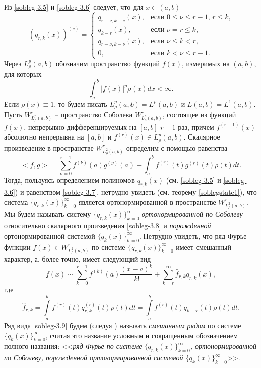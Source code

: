  Из \eqref{sobleg-3.5} и \eqref{sobleg-3.6} следует, что для $x\in (a,b)$
 \begin{equation}\label{sobleg-3.7}
(q_{r,k}(x))^{(\nu)} =\begin{cases}q_{r-\nu,k-\nu}(x),&\text{если $0\le\nu\le r-1$, $r\le k$,}\\
q_{k-r}(x),&\text{если  $\nu=r\le k$,}\\
q_{r-\nu,k-\nu}(x),&\text{если $\nu\le k< r$,}\\
0,&\text{если $k< \nu\le r-1$}.
  \end{cases}
\end{equation}
Через $L^p_\rho(a,b)$ обозначим пространство  функций $f(x)$, измеримых  на  $(a,b)$, для которых $$\int_a^b|f(x)|^p\rho(x)dx<\infty.$$
Если $\rho(x)\equiv1$, то будем писать $L^p_\rho(a,b)=L^p(a,b)$ и $L(a,b)=L^1(a,b)$.
Пусть $W^r_{L^p_\rho(a,b)}$ -- пространство Соболева $W^r_{L^p_\rho(a,b)}$, состоящее из функций $f(x)$, непрерывно дифференцируемых на $[a,b]$ $r-1$ раз, причем $f^{(r-1)}(x)$ абсолютно непрерывна на $[a,b]$  и $f^{(r)}(x)\in L^p_\rho(a,b)$.
Скалярное произведение в пространстве $W^r_{L^2_\rho(a,b)}$ определим с помощью равенства
\begin{equation}\label{sobleg-3.8}
<f,g>=\sum_{\nu=0}^{r-1}f^{(\nu)}(a)g^{(\nu)}(a)+\int_{a}^{b} f^{(r)}(t)g^{(r)}(t)\rho(t) dt.
\end{equation}
Тогда, пользуясь определением полиномов $q_{r,k}(x)$ (см. \eqref{sobleg-3.5} и \eqref{sobleg-3.6}) и равенством  \eqref{sobleg-3.7}, нетрудно увидеть (см. теорему \ref{soblegstate1}),  что система $\{q_{r,k}(x)\}_{k=0}^\infty$ является ортонормированной в пространстве $W^r_{L^2_\rho(a,b)}$.  Мы будем называть систему $\{q_{r,k}(x)\}_{k=0}^\infty$ \textit{ ортонормированной по Соболеву } относительно скалярного произведения \eqref{sobleg-3.8} и  \textit{ порожденной} ортонормированной системой $\{q_{k}(x)\}_{k=0}^\infty$.
Нетрудно увидеть,  что ряд Фурье функции $f(x)\in W^r_{L^2_\rho(a,b)}$ по системе  $\{q_{r,k}(x)\}_{k=0}^\infty$ имеет смешанный характер, а, более точно, имеет следующий вид
  \begin{equation}\label{sobleg-3.9}
f(x)\sim \sum_{k=0}^{r-1} f^{(k)}(a)\frac{(x-a)^k}{k!}+ \sum_{k=r}^\infty \hat f_{r,k}q_{r,k}(x),
\end{equation}
где
  \begin{equation}\label{sobleg-3.10}
 \hat f_{r,k}=\int\limits_a^b f^{(r)}(t) q^{(r)}_{r,k}(t)\rho(t)dt=\int\limits_a^b f^{(r)}(t) q_{k-r}(t)\rho(t)dt.
\end{equation}
Ряд  вида \eqref{sobleg-3.9} будем (следуя  \cite{sobleg-Shar11, sobleg-Shar12, sobleg-Shar13, sobleg-Shar15, sobleg-Shar16, sobleg-Shar17, sobleg-Shar18, sobleg-sharap3, sobleg-SHII})   называть \textit{ смешанным рядом} по  системе $\{q_{k}(x)\}_{k=0}^\infty$, считая это название условным и сокращенным обозначением полного названия: <<\textit{ряд Фурье по системе  $\{q_{r,k}(x)\}_{k=0}^\infty$, ортонормированной по Соболеву, порожденной ортонормированной системой $\{q_{k}(x)\}_{k=0}^\infty$}>>.

